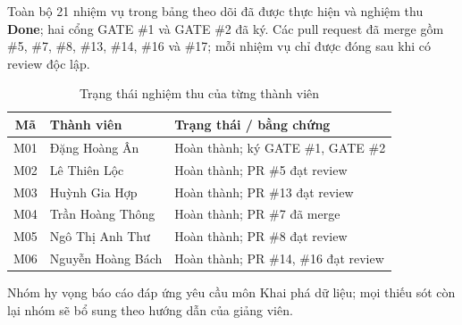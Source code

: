 Toàn bộ 21 nhiệm vụ trong bảng theo dõi đã được thực hiện và nghiệm thu \textbf{Done};
hai cổng GATE \#1 và GATE \#2 đã ký. Các pull request đã merge gồm \#5, \#7, \#8, \#13,
\#14, \#16 và \#17; mỗi nhiệm vụ chỉ được đóng sau khi có review độc lập.

\begin{table}[H]
\centering
\caption{Trạng thái nghiệm thu của từng thành viên}
\begin{tabular}{|c|l|l|}
\hline
\textbf{Mã} & \textbf{Thành viên} & \textbf{Trạng thái / bằng chứng} \\
\hline
M01 & Đặng Hoàng Ân   & Hoàn thành; ký GATE \#1, GATE \#2 \\
\hline
M02 & Lê Thiên Lộc    & Hoàn thành; PR \#5 đạt review \\
\hline
M03 & Huỳnh Gia Hợp    & Hoàn thành; PR \#13 đạt review \\
\hline
M04 & Trần Hoàng Thông & Hoàn thành; PR \#7 đã merge \\
\hline
M05 & Ngô Thị Anh Thư   & Hoàn thành; PR \#8 đạt review \\
\hline
M06 & Nguyễn Hoàng Bách & Hoàn thành; PR \#14, \#16 đạt review \\
\hline
\end{tabular}
\end{table}

Nhóm hy vọng báo cáo đáp ứng yêu cầu môn Khai phá dữ liệu; mọi thiếu sót còn lại nhóm sẽ
bổ sung theo hướng dẫn của giảng viên.
